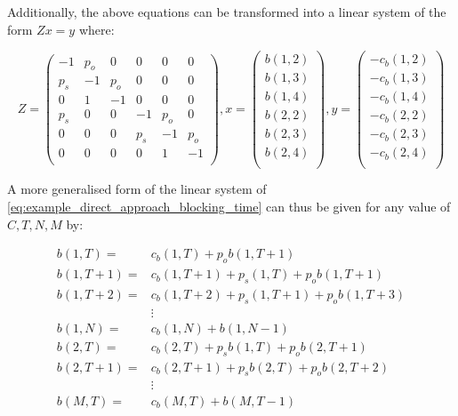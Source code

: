 Additionally, the above equations can be transformed into a linear system of the
form \(Zx=y\) where:

\begin{equation}\label{eq:example_direct_approach_blocking_time}
    Z=
    \begin{pmatrix}
         -1 & p_o &   0 &   0 &   0 &   0 \\ %
        p_s &  -1 & p_o &   0 &   0 &   0 \\ %
          0 &   1 & - 1 &   0 &   0 &   0 \\ %
        p_s &   0 &   0 &  -1 & p_o &   0 \\ %
          0 &   0 &   0 & p_s &  -1 & p_o \\ %
          0 &   0 &   0 &   0 &   1 &  -1 \\ %
    \end{pmatrix},
    x=
    \begin{pmatrix}
        b(1,2) \\
        b(1,3) \\
        b(1,4) \\
        b(2,2) \\
        b(2,3) \\
        b(2,4) \\
    \end{pmatrix},
    y=
    \begin{pmatrix}
        -c_b(1,2) \\
        -c_b(1,3) \\
        -c_b(1,4) \\
        -c_b(2,2) \\
        -c_b(2,3) \\
        -c_b(2,4) \\
    \end{pmatrix}
\end{equation}

A more generalised form of the linear system of
\ref{eq:example_direct_approach_blocking_time} can thus be given for any value
of \(C,T,N,M\) by:

\begin{align}
    b(1,T) =& c_b(1, T) + p_o b(1, T + 1)
    \label{eq:first_eq_of_blocking_general}\\
    b(1,T + 1) =& c_b(1, T + 1) + p_s(1, T) + p_o b(1, T + 1) \\
    b(1,T + 2) =& c_b(1, T + 2) + p_s(1, T + 1) + p_o b(1, T + 3) \\
    & \vdots \\
    b(1, N) =& c_b(1, N) + b(1, N - 1) \\
    b(2, T) =& c_b(2, T) + p_s b(1, T) + p_o b(2, T + 1) \\
    b(2, T + 1) =& c_b(2, T + 1) + p_s b(2, T) + p_o b(2, T + 2) \\
    & \vdots \\
    b(M, T) =& c_b(M, T) + b(M, T-1) \label{eq:last_eq_of_blocking_general}
\end{align}

